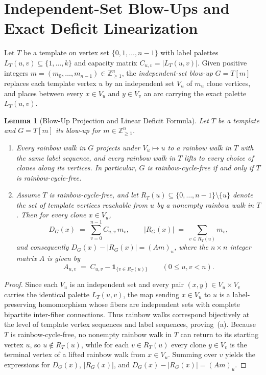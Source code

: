 \documentclass[10pt,reqno]{amsart}
\newtheorem{lemma}[theorem]{Lemma}
\theoremstyle{definition}
\begin{document}
\section{Independent-Set Blow-Ups and Exact Deficit Linearization}

Let $T$ be a template on vertex set $\{0,1,\dots,n-1\}$ with label palettes $L_T(u,v)\subseteq\{1,\dots,k\}$ and capacity matrix $C_{u,v}=|L_T(u,v)|$. Given positive integers $m=(m_0,\dots,m_{n-1})\in\mathbb{Z}_{\ge 1}^n$, the \emph{independent-set blow-up} $G=T[m]$ replaces each template vertex $u$ by an independent set $V_u$ of $m_u$ clone vertices, and places between every $x\in V_u$ and $y\in V_v$ an arc carrying the exact palette $L_T(u,v)$.

\begin{lemma}[Blow-Up Projection and Linear Deficit Formula]\label{lem:blowup}
Let $T$ be a template and $G=T[m]$ its blow-up for $m\in\mathbb{Z}_{\ge 1}^n$.
\begin{enumerate}[label=\textup{(\alph*)}]
  \item Every rainbow walk in $G$ projects under $V_u\mapsto u$ to a rainbow walk in $T$ with the same label sequence, and every rainbow walk in $T$ lifts to every choice of clones along its vertices. In particular, $G$ is rainbow-cycle-free if and only if $T$ is rainbow-cycle-free.
  \item Assume $T$ is rainbow-cycle-free, and let $R_T(u)\subseteq\{0,\dots,n-1\}\setminus\{u\}$ denote the set of template vertices reachable from $u$ by a nonempty rainbow walk in $T$. Then for every clone $x\in V_u$,
  \[
    D_G(x) \;=\; \sum_{v=0}^{n-1} C_{u,v}\, m_v,
    \qquad
    |R_G(x)| \;=\; \sum_{v\in R_T(u)} m_v,
  \]
  and consequently $D_G(x)-|R_G(x)| = (A m)_u$, where the $n\times n$ integer matrix $A$ is given by
  \[
    A_{u,v} \;=\; C_{u,v} - \mathbf{1}_{\{v\in R_T(u)\}} \qquad (0\le u,v < n).
  \]
\end{enumerate}
\end{lemma}

\begin{proof}
Since each $V_u$ is an independent set and every pair $(x,y)\in V_u\times V_v$ carries the identical palette $L_T(u,v)$, the map sending $x\in V_u$ to $u$ is a label-preserving homomorphism whose fibers are independent sets with complete bipartite inter-fiber connections. Thus rainbow walks correspond bijectively at the level of template vertex sequences and label sequences, proving~(a). Because $T$ is rainbow-cycle-free, no nonempty rainbow walk in $T$ can return to its starting vertex $u$, so $u\notin R_T(u)$, while for each $v\in R_T(u)$ every clone $y\in V_v$ is the terminal vertex of a lifted rainbow walk from $x\in V_u$. Summing over $v$ yields the expressions for $D_G(x)$, $|R_G(x)|$, and $D_G(x)-|R_G(x)|=(Am)_u$.
\end{proof}
\end{document}
